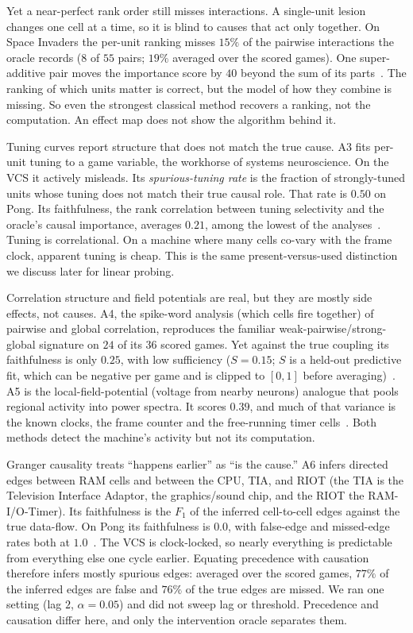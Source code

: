 Yet a near-perfect rank order still misses interactions. A single-unit lesion
changes one cell at a time, so it is blind to causes that act only together. On
Space Invaders the per-unit ranking misses $15\%$ of the pairwise interactions the
oracle records ($8$ of $55$ pairs; $19\%$ averaged over the scored games). One
super-additive pair moves the importance score by $40$ beyond the sum of its
parts~\cite{leaderboardP2}. The ranking of which units
matter is correct, but the model of how they combine is missing. So even the
strongest classical method recovers a ranking, not the computation. An effect
map does not show the algorithm behind it.

Tuning curves report structure that does not match the true cause. A3 fits
per-unit tuning to a game variable, the workhorse of systems neuroscience. On the
VCS it actively misleads. Its \emph{spurious-tuning rate} is the fraction of
strongly-tuned units whose tuning does not match their true causal role. That
rate is $0.50$ on Pong. Its faithfulness, the rank correlation between tuning
selectivity and the oracle's causal importance, averages $0.21$, among the lowest of
the analyses~\cite{leaderboardP2}. Tuning is correlational. On a machine where many
cells co-vary with the frame clock, apparent tuning is cheap. This is the same
present-versus-used distinction we discuss later for linear probing.

Correlation structure and field potentials are real, but they are mostly side
effects, not causes. A4, the spike-word analysis (which cells fire together) of pairwise and global
correlation, reproduces the familiar weak-pairwise/strong-global signature on $24$ of its $36$
scored games. Yet
against the true coupling its faithfulness is only $0.25$, with low sufficiency
($S = 0.15$; $S$ is a held-out predictive fit, which can be negative per game and is clipped to $[0,1]$ before averaging)~\cite{leaderboardP2}. A5 is the local-field-potential (voltage from nearby neurons)
analogue that pools regional activity into power spectra. It scores $0.39$, and
much of that variance is the known clocks, the frame counter and the free-running
timer cells~\cite{leaderboardP2}. Both methods detect the machine's activity but not
its computation.

Granger causality treats ``happens earlier'' as ``is the cause.'' A6 infers
directed edges between RAM cells and between the CPU, TIA, and RIOT (the TIA is the Television Interface Adaptor, the graphics/sound chip, and the RIOT the RAM-I/O-Timer). Its faithfulness is the $F_1$ of the inferred cell-to-cell edges against the true data-flow. On Pong
its faithfulness is $0.0$, with false-edge and missed-edge rates both at
$1.0$~\cite{leaderboardP2}. The VCS is clock-locked, so nearly everything is
predictable from everything else one cycle earlier. Equating precedence with
causation therefore infers mostly spurious edges: averaged over the scored games,
$77\%$ of the inferred edges are false and $76\%$ of the true edges are missed. We
ran one setting (lag $2$, $\alpha=0.05$) and did not sweep lag or threshold.
Precedence and causation differ here, and only the intervention oracle separates
them.

